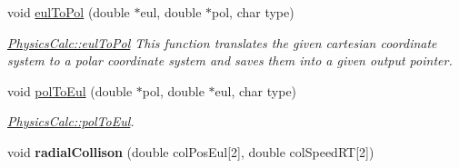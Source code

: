\begin{DoxyCompactItemize}
void \hyperlink{class_physics_calc_af038d3a5fe0160410456b14601a95581}{eul\+To\+Pol} (double $\ast$eul, double $\ast$pol, char type)
\begin{DoxyCompactList}\small\item\em \hyperlink{class_physics_calc_af038d3a5fe0160410456b14601a95581}{Physics\+Calc\+::eul\+To\+Pol} This function translates the given cartesian coordinate system to a polar coordinate system and saves them into a given output pointer. \end{DoxyCompactList}\item 
void \hyperlink{class_physics_calc_a441c3e94fe0e6eed1d96531368f50d54}{pol\+To\+Eul} (double $\ast$pol, double $\ast$eul, char type)
\begin{DoxyCompactList}\small\item\em \hyperlink{class_physics_calc_a441c3e94fe0e6eed1d96531368f50d54}{Physics\+Calc\+::pol\+To\+Eul}. \end{DoxyCompactList}\item 
void {\bfseries radial\+Collison} (double col\+Pos\+Eul\mbox{[}2\mbox{]}, double col\+Speed\+RT\mbox{[}2\mbox{]})\hypertarget{class_physics_calc_a2eabcd0d018806138c1141feedb13589}{}\label{class_physics_calc_a2eabcd0d018806138c1141feedb13589}


\end{DoxyCompactItemize}

